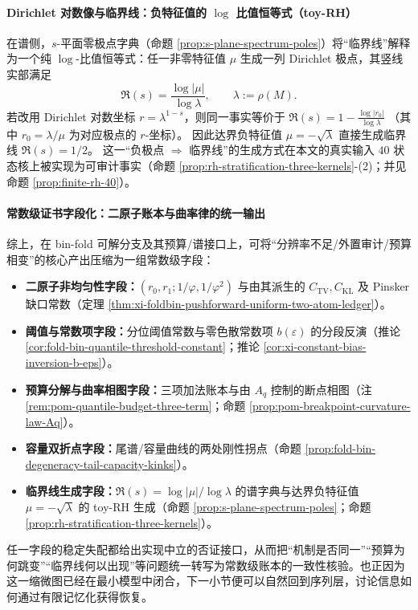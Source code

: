 \paragraph{Dirichlet 对数像与临界线：负特征值的 \texorpdfstring{$\log$}{log} 比值恒等式（toy-RH）}
在谱侧，\(s\)-平面零极点字典（命题 \ref{prop:s-plane-spectrum-poles}）将“临界线”解释为一个纯 \(\log\)-比值恒等式：任一非零特征值 \(\mu\) 生成一列 Dirichlet 极点，其竖线实部满足
\[
\Re(s)=\frac{\log|\mu|}{\log\lambda},
\qquad \lambda:=\rho(M).
\]
若改用 Dirichlet 对数坐标 \(r=\lambda^{1-s}\)，则同一事实等价于
\(
\Re(s)=1-\frac{\log|r_0|}{\log\lambda}
\)
（其中 \(r_0=\lambda/\mu\) 为对应极点的 \(r\)-坐标）。
因此达界负特征值 \(\mu=-\sqrt{\lambda}\) 直接生成临界线 \(\Re(s)=1/2\)。
这一“负极点 \(\Rightarrow\) 临界线”的生成方式在本文的真实输入 \(40\) 状态核上被实现为可审计事实（命题 \ref{prop:rh-stratification-three-kernels}-(2)；并见命题 \ref{prop:finite-rh-40}）。

\paragraph{常数级证书字段化：二原子账本与曲率律的统一输出}
综上，在 bin-fold 可解分支及其预算/谱接口上，可将“分辨率不足/外置审计/预算相变”的核心产出压缩为一组常数级字段：
\begin{itemize}
  \item \textbf{二原子非均匀性字段：}\((r_0,r_1;1/\varphi,1/\varphi^2)\) 与由其派生的 \(C_{\mathrm{TV}},C_{\mathrm{KL}}\) 及 Pinsker 缺口常数（定理 \ref{thm:xi-foldbin-pushforward-uniform-two-atom-ledger}）。
  \item \textbf{阈值与常数项字段：}分位阈值常数与零色散常数项 \(b(\varepsilon)\) 的分段反演（推论 \ref{cor:fold-bin-quantile-threshold-constant}；推论 \ref{cor:xi-constant-bias-inversion-b-eps}）。
  \item \textbf{预算分解与曲率相图字段：}三项加法账本与由 \(A_q\) 控制的断点相图（注 \ref{rem:pom-quantile-budget-three-term}；命题 \ref{prop:pom-breakpoint-curvature-law-Aq}）。
  \item \textbf{容量双折点字段：}尾谱/容量曲线的两处刚性拐点（命题 \ref{prop:fold-bin-degeneracy-tail-capacity-kinks}）。
  \item \textbf{临界线生成字段：}\(\Re(s)=\log|\mu|/\log\lambda\) 的谱字典与达界负特征值 \(\mu=-\sqrt\lambda\) 的 toy-RH 生成（命题 \ref{prop:s-plane-spectrum-poles}；命题 \ref{prop:rh-stratification-three-kernels}）。
\end{itemize}
任一字段的稳定失配都给出实现中立的否证接口，从而把“机制是否同一”“预算为何跳变”“临界线何以出现”等问题统一转写为常数级账本的一致性核验。也正因为这一缩微图已经在最小模型中闭合，下一小节便可以自然回到序列层，讨论信息如何通过有限记忆化获得恢复。

